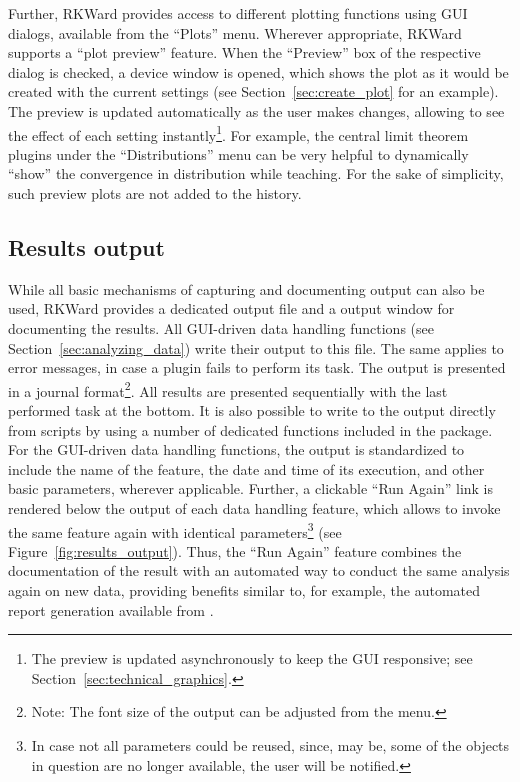 Further, RKWard provides access to different plotting functions using GUI dialogs,
available from the ``Plots'' menu. Wherever appropriate, RKWard supports a ``plot
preview'' feature. When the ``Preview'' box of
the respective dialog is checked, a device window is opened, which
shows the plot as it would be created with the current settings (see Section~\ref{sec:create_plot} for an example). The
preview is updated automatically as the user makes changes, allowing to
see the effect of each setting instantly\footnote{The preview is
updated asynchronously to keep the GUI responsive; see Section~\ref{sec:technical_graphics}.}. For example, the
central limit theorem plugins
under the ``Distributions'' menu can be very helpful to dynamically ``show''
the convergence in distribution while teaching. For the sake of simplicity, such preview plots are not added to
the history.

\subsection{Results output}
\label{sec:results_output}

While all basic mechanisms of
capturing and documenting  output can also
be used, RKWard provides a dedicated output file and a output
window for documenting the results. All GUI-driven data handling
functions (see Section~\ref{sec:analyzing_data}) write their output to this file. 
The same applies to error messages, in case a plugin fails to perform its task.
The output is presented in a journal format\footnote{Note: The font size of the output can be adjusted
from the menu. 
}. All results are presented
sequentially with the last performed task at the bottom.
It is also possible to write to the output directly from 
scripts by using a number of dedicated 
functions included in the  package. For the GUI-driven data handling functions, the output is
standardized to include the name of the feature, the date and time of
its execution, and other basic parameters, wherever
applicable. Further, a clickable ``Run
Again'' link is rendered below the output of each data
handling feature, which allows to invoke the same feature again with
identical parameters\footnote{In case not all parameters could be
reused, since, may be, some of the objects in
question are no longer available, the user will be notified.} (see
Figure~\ref{fig:results_output}). Thus, the ``Run
Again'' feature combines the documentation of the result
with an automated way to conduct the same analysis again on new
data, providing benefits similar to, for example, the automated report generation
available from  \citep{RaffelsbergerW2008}.

